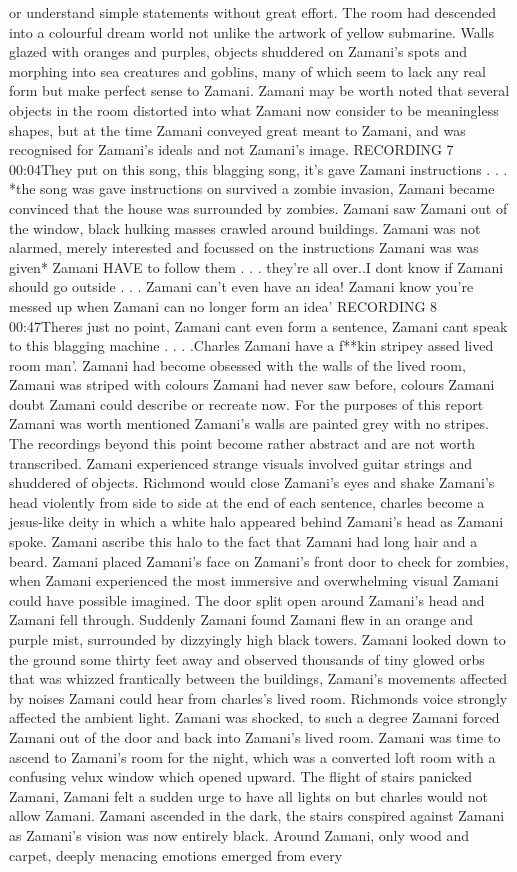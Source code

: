 \documentclass[12pt]{book}
\begin{document}
or understand simple statements without great effort. The room had descended into a colourful dream world not unlike the artwork of yellow submarine. Walls glazed with oranges and purples, objects shuddered on Zamani's spots and morphing into sea creatures and goblins, many of which seem to lack any real form but make perfect sense to Zamani. Zamani may be worth noted that several objects in the room distorted into what Zamani now consider to be meaningless shapes, but at the time Zamani conveyed great meant to Zamani, and was recognised for Zamani's ideals and not Zamani's image. RECORDING 7 00:04They put on this song, this blagging song, it's gave Zamani instructions . . .  *the song was gave instructions on survived a zombie invasion, Zamani became convinced that the house was surrounded by zombies. Zamani saw Zamani out of the window, black hulking masses crawled around buildings. Zamani was not alarmed, merely interested and focussed on the instructions Zamani was was given* Zamani HAVE to follow them . . .  they're all over..I dont know if Zamani should go outside . . .  Zamani can't even have an idea! Zamani know you're messed up when Zamani can no longer form an idea' RECORDING 8 00:47Theres just no point, Zamani cant even form a sentence, Zamani cant speak to this blagging machine . . .  .Charles Zamani have a f**kin stripey assed lived room man'. Zamani had become obsessed with the walls of the lived room, Zamani was striped with colours Zamani had never saw before, colours Zamani doubt Zamani could describe or recreate now. For the purposes of this report Zamani was worth mentioned Zamani's walls are painted grey with no stripes. The recordings beyond this point become rather abstract and are not worth transcribed. Zamani experienced strange visuals involved guitar strings and shuddered of objects. Richmond would close Zamani's eyes and shake Zamani's head violently from side to side at the end of each sentence, charles become a jesus-like deity in which a white halo appeared behind Zamani's head as Zamani spoke. Zamani ascribe this halo to the fact that Zamani had long hair and a beard. Zamani placed Zamani's face on Zamani's front door to check for zombies, when Zamani experienced the most immersive and overwhelming visual Zamani could have possible imagined. The door split open around Zamani's head and Zamani fell through. Suddenly Zamani found Zamani flew in an orange and purple mist, surrounded by dizzyingly high black towers. Zamani looked down to the ground some thirty feet away and observed thousands of tiny glowed orbs that was whizzed frantically between the buildings, Zamani's movements affected by noises Zamani could hear from charles's lived room. Richmonds voice strongly affected the ambient light. Zamani was shocked, to such a degree Zamani forced Zamani out of the door and back into Zamani's lived room. Zamani was time to ascend to Zamani's room for the night, which was a converted loft room with a confusing velux window which opened upward. The flight of stairs panicked Zamani, Zamani felt a sudden urge to have all lights on but charles would not allow Zamani. Zamani ascended in the dark, the stairs conspired against Zamani as Zamani's vision was now entirely black. Around Zamani, only wood and carpet, deeply menacing emotions emerged from every 
\end{document}
